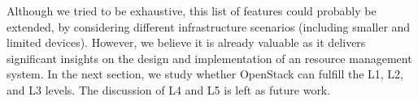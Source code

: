 Although we tried to be exhaustive, this list of features could
probably be extended, \eg by considering different \edge
infrastructure scenarios (\eg including smaller and limited devices).
However, we believe it is already valuable as it delivers significant
insights on the design and implementation of an \edge resource management
system. In the next section, we study whether OpenStack can fulfill the L1, L2,
and L3 levels. The discussion of L4 and L5 is left as future work.

